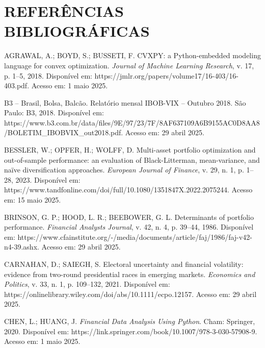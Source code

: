 
\chapter*{REFERÊNCIAS BIBLIOGRÁFICAS}


\begin{thebibliography}{99}

AGRAWAL, A.; BOYD, S.; BUSSETI, F. CVXPY: a Python-embedded modeling language for convex optimization. \textit{Journal of Machine Learning Research}, v. 17, p. 1--5, 2018. Disponível em: https://jmlr.org/papers/volume17/16-403/16-403.pdf. Acesso em: 1 maio 2025.

B3 -- Brasil, Bolsa, Balcão. Relatório mensal IBOB-VIX -- Outubro 2018. São Paulo: B3, 2018. Disponível em: https://www.b3.com.br/data/files/9E/97/23/7F/8AF637109A6B9155AC0D8AA8/BOLETIM\_IBOBVIX\_out2018.pdf. Acesso em: 29 abril 2025.

BESSLER, W.; OPFER, H.; WOLFF, D. Multi-asset portfolio optimization and out-of-sample performance: an evaluation of Black-Litterman, mean-variance, and naïve diversification approaches. \textit{European Journal of Finance}, v. 29, n. 1, p. 1--28, 2023. Disponível em: https://www.tandfonline.com/doi/full/10.1080/1351847X.2022.2075244. Acesso em: 15 maio 2025.

BRINSON, G. P.; HOOD, L. R.; BEEBOWER, G. L. Determinants of portfolio performance. \textit{Financial Analysts Journal}, v. 42, n. 4, p. 39--44, 1986. Disponível em: https://www.cfainstitute.org/-/media/documents/article/faj/1986/faj-v42-n4-39.ashx. Acesso em: 29 abril 2025.

CARNAHAN, D.; SAIEGH, S. Electoral uncertainty and financial volatility: evidence from two-round presidential races in emerging markets. \textit{Economics and Politics}, v. 33, n. 1, p. 109--132, 2021. Disponível em: https://onlinelibrary.wiley.com/doi/abs/10.1111/ecpo.12157. Acesso em: 29 abril 2025.

CHEN, L.; HUANG, J. \textit{Financial Data Analysis Using Python}. Cham: Springer, 2020. Disponível em: https://link.springer.com/book/10.1007/978-3-030-57908-9. Acesso em: 1 maio 2025.


\end{thebibliography}
